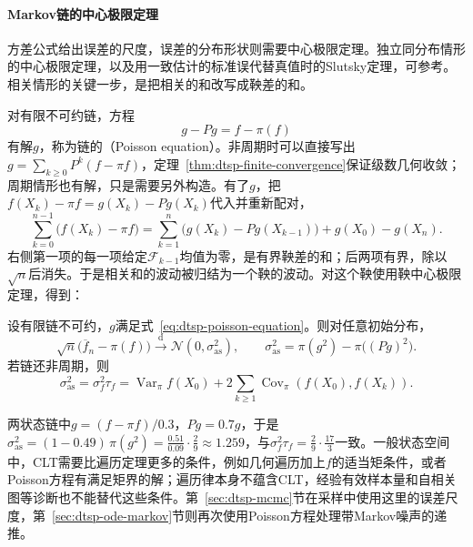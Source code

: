 \paragraph{Markov链的中心极限定理}
方差公式给出误差的尺度，误差的分布形状则需要中心极限定理。独立同分布情形的中心极限定理，以及用一致估计的标准误代替真值时的Slutsky定理，可参考。相关情形的关键一步，是把相关的和改写成鞅差的和。

对有限不可约链，方程
\begin{equation}
  g-Pg=f-\pi(f)
  \label{eq:dtsp-poisson-equation}
\end{equation}
有解$g$，称为链的（Poisson equation）。非周期时可以直接写出$g=\sum_{k\geq0}P^k(f-\pi f)$，定理~\ref{thm:dtsp-finite-convergence}保证级数几何收敛；周期情形也有解，只是需要另外构造。有了$g$，把$f(X_k)-\pi f=g(X_k)-Pg(X_k)$代入并重新配对，
\[
  \sum_{k=0}^{n-1}\bigl(f(X_k)-\pi f\bigr)=\sum_{k=1}^{n}\bigl(g(X_k)-Pg(X_{k-1})\bigr)+g(X_0)-g(X_n).
\]
右侧第一项的每一项给定$\mathcal F_{k-1}$均值为零，是有界鞅差的和；后两项有界，除以$\sqrt n$后消失。于是相关和的波动被归结为一个鞅的波动。对这个鞅使用鞅中心极限定理，得到：

\begin{theorem}[有限链的中心极限定理]
  \label{thm:dtsp-markov-clt}
  设有限链不可约，$g$满足式~\eqref{eq:dtsp-poisson-equation}。则对任意初始分布，
  \[
    \sqrt n\bigl(\overline f_n-\pi(f)\bigr)\xrightarrow{\ \mathrm d\ }\mathcal N(0,\sigma_{\mathrm{as}}^2),\qquad
    \sigma_{\mathrm{as}}^2=\pi(g^2)-\pi\bigl((Pg)^2\bigr).
  \]
  若链还非周期，则
  \[
    \sigma_{\mathrm{as}}^2=\sigma_f^2\tau_f=\operatorname{Var}_\pi f(X_0)+2\sum_{k\geq1}\operatorname{Cov}_\pi(f(X_0),f(X_k)) .
  \]
\end{theorem}

两状态链中$g=(f-\pi f)/0.3$，$Pg=0.7g$，于是$\sigma_{\mathrm{as}}^2=(1-0.49)\,\pi(g^2)=\frac{0.51}{0.09}\cdot\frac29\approx1.259$，与$\sigma_f^2\tau_f=\frac29\cdot\frac{17}3$一致。一般状态空间中，CLT需要比遍历定理更多的条件，例如几何遍历加上$f$的适当矩条件，或者Poisson方程有满足矩界的解；遍历律本身不蕴含CLT，经验有效样本量和自相关图等诊断也不能替代这些条件。第~\ref{sec:dtsp-mcmc}节在采样中使用这里的误差尺度，第~\ref{sec:dtsp-ode-markov}节则再次使用Poisson方程处理带Markov噪声的递推。
